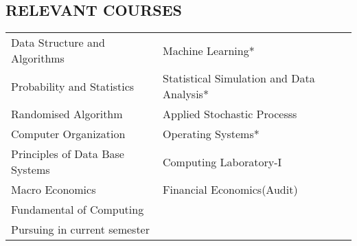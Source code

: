 \documentclass[margin]{res}
\begin{document}
\begin{resume}
\section{RELEVANT COURSES}
\begin{tabular}{ l l }
 Data Structure and Algorithms & Machine Learning*\\ 
 Probability and Statistics & Statistical Simulation and Data Analysis*\\ 
    Randomised Algorithm & Applied Stochastic Processs \\ 
   Computer Organization & Operating Systems*  \\
   Principles of Data Base Systems
 & Computing Laboratory-I\\
  Macro Economics & Financial Economics(Audit) \\
  Fundamental of Computing & \\
  {\scriptsize * Pursuing in current semester}& \\
\end{tabular}


\end{resume}
\end{document}
